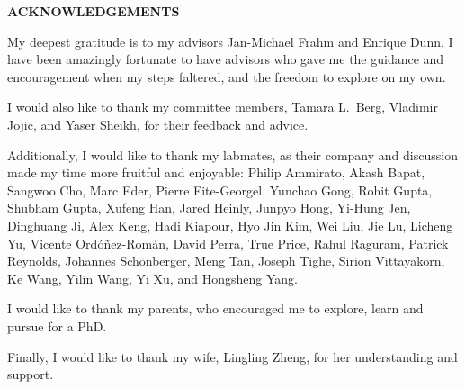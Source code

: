 
\begin{center}
\vspace*{46pt}
\textbf{ACKNOWLEDGEMENTS}
\vspace{10pt}
\end{center}


My deepest gratitude is to my advisors Jan-Michael Frahm and Enrique Dunn. I have been amazingly fortunate to have advisors who gave me the guidance and encouragement when my steps faltered, and the freedom to explore on my own.

I would also like to thank my committee members, Tamara L.~Berg, Vladimir Jojic, and Yaser Sheikh, for their feedback and advice.

Additionally, I would like to thank my labmates, as their company and discussion made my time more fruitful and enjoyable:
Philip Ammirato,
Akash Bapat,
Sangwoo Cho,
Marc Eder,
Pierre Fite-Georgel,
Yunchao Gong,
Rohit Gupta,
Shubham Gupta,
Xufeng Han,
Jared Heinly,
Junpyo Hong,
Yi-Hung Jen,
Dinghuang Ji,
Alex Keng,
Hadi Kiapour,
Hyo Jin Kim,
Wei Liu,
Jie Lu,
Licheng Yu,
Vicente Ord\'{o}\~{n}ez-Rom\'{a}n,
David Perra,
True Price,
Rahul Raguram,
Patrick Reynolds,
Johannes Sch\"{o}nberger,
Meng Tan,
Joseph Tighe,
Sirion Vittayakorn,
Ke Wang,
Yilin Wang,
Yi Xu,
and
Hongsheng Yang.

I would like to thank my parents, who encouraged me to explore, learn and pursue for a PhD.

Finally, I would like to thank my wife, Lingling Zheng, for her understanding and support.

\clearpage
